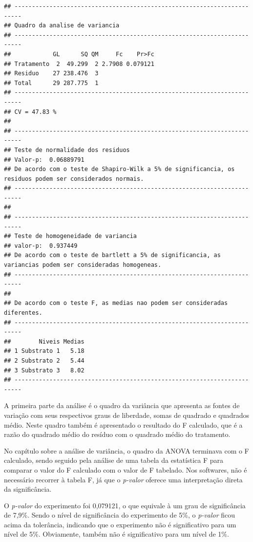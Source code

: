 \documentclass[
]{article}
\begin{document}
\begin{verbatim}
## ------------------------------------------------------------------------
## Quadro da analise de variancia
## ------------------------------------------------------------------------
##            GL      SQ QM     Fc    Pr>Fc
## Tratamento  2  49.299  2 2.7908 0.079121
## Residuo    27 238.476  3                
## Total      29 287.775  1                
## ------------------------------------------------------------------------
## CV = 47.83 %
## 
## ------------------------------------------------------------------------
## Teste de normalidade dos residuos 
## Valor-p:  0.06889791 
## De acordo com o teste de Shapiro-Wilk a 5% de significancia, os residuos podem ser considerados normais.
## ------------------------------------------------------------------------
## 
## ------------------------------------------------------------------------
## Teste de homogeneidade de variancia 
## valor-p:  0.937449 
## De acordo com o teste de bartlett a 5% de significancia, as variancias podem ser consideradas homogeneas.
## ------------------------------------------------------------------------
## 
## De acordo com o teste F, as medias nao podem ser consideradas diferentes.
## ------------------------------------------------------------------------
##        Niveis Medias
## 1 Substrato 1   5.18
## 2 Substrato 2   5.44
## 3 Substrato 3   8.02
## ------------------------------------------------------------------------
\end{verbatim}

A primeira parte da análise é o quadro da variância que apresenta as fontes de variação com seus respectivos graus de liberdade, somas de quadrado e quadrados médio. Neste quadro também é apresentado o resultado do F calculado, que é a razão do quadrado médio do resíduo com o quadrado médio do tratamento.

No capítulo sobre a análise de variância, o quadro da ANOVA terminava com o F calculado, sendo seguido pela análise de uma tabela da estatística F para comparar o valor do F calculado com o valor de F tabelado. Nos softwares, não é necessário recorrer à tabela F, já que o \emph{p-valor} oferece uma interpretação direta da significância.

O \emph{p-valor} do experimento foi 0,079121, o que equivale à um grau de significância de 7,9\%. Sendo o nível de significância do experimento de 5\%, o \emph{p-valor} ficou acima da tolerância, indicando que o experimento não é significativo para um nível de 5\%. Obviamente, também não é significativo para um nível de 1\%.
\end{document}
